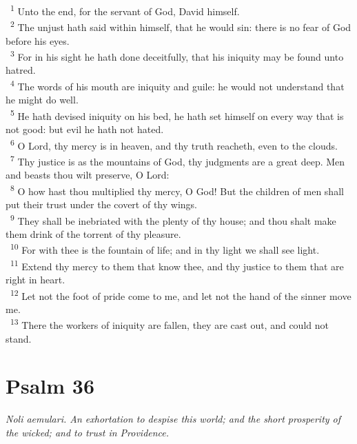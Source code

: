 \documentclass[a5paper,12pt]{article}
\begin{document}
\begin{multicols*}{2}
~\textsuperscript{1} Unto the end, for the servant of God, David himself.\\
~\textsuperscript{2} The unjust hath said within himself, that he would sin: there is no fear of God before his eyes.\\
~\textsuperscript{3} For in his sight he hath done deceitfully, that his iniquity may be found unto hatred.\\
~\textsuperscript{4} The words of his mouth are iniquity and guile: he would not understand that he might do well.\\
~\textsuperscript{5} He hath devised iniquity on his bed, he hath set himself on every way that is not good: but evil he hath not hated.\\
~\textsuperscript{6} O Lord, thy mercy is in heaven, and thy truth reacheth, even to the clouds.\\
~\textsuperscript{7} Thy justice is as the mountains of God, thy judgments are a great deep. Men and beasts thou wilt preserve, O Lord:\\
~\textsuperscript{8} O how hast thou multiplied thy mercy, O God! But the children of men shall put their trust under the covert of thy wings.\\
~\textsuperscript{9} They shall be inebriated with the plenty of thy house; and thou shalt make them drink of the torrent of thy pleasure.\\
~\textsuperscript{10} For with thee is the fountain of life; and in thy light we shall see light.\\
~\textsuperscript{11} Extend thy mercy to them that know thee, and thy justice to them that are right in heart.\\
~\textsuperscript{12} Let not the foot of pride come to me, and let not the hand of the sinner move me.\\
~\textsuperscript{13} There the workers of iniquity are fallen, they are cast out, and could not stand.\\

\section{Psalm 36}
\label{sec:org5e4a3a2}
\emph{Noli aemulari. An exhortation to despise this world; and the short prosperity of the wicked; and to trust in Providence.}\\


\end{multicols*}
\end{document}
